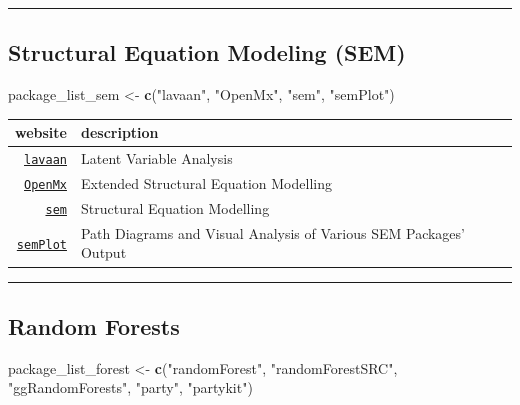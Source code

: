 \documentclass[]{book}
\newenvironment{Shaded}{\begin{snugshade}}{\end{snugshade}}
\newcommand{\KeywordTok}[1]{\textcolor[rgb]{0.13,0.29,0.53}{\textbf{#1}}}
\newcommand{\StringTok}[1]{\textcolor[rgb]{0.31,0.60,0.02}{#1}}
\newcommand{\NormalTok}[1]{#1}
\theoremstyle{definition}
\theoremstyle{definition}
\theoremstyle{definition}
\theoremstyle{remark}
\begin{document}
\begin{center}\rule{0.5\linewidth}{\linethickness}\end{center}

\subsection{Structural Equation Modeling
(SEM)}\label{structural-equation-modeling-sem}

\begin{Shaded}
\begin{Highlighting}[]
\NormalTok{package_list_sem <-}\StringTok{ }\KeywordTok{c}\NormalTok{(}\StringTok{"lavaan"}\NormalTok{,}
                      \StringTok{"OpenMx"}\NormalTok{,}
                      \StringTok{"sem"}\NormalTok{,}
                      \StringTok{"semPlot"}\NormalTok{)}
\end{Highlighting}
\end{Shaded}

\begin{longtable}[]{@{}rl@{}}
\toprule
website & description\tabularnewline
\midrule
\endhead
\href{http://lavaan.org}{\texttt{lavaan}} & Latent Variable
Analysis\tabularnewline
\href{https://openmx.ssri.psu.edu/}{\texttt{OpenMx}} & Extended
Structural Equation Modelling\tabularnewline
\href{https://www.methodsconsultants.com/tutorial/structural-equation-models-using-the-sem-package-in-r/}{\texttt{sem}}
& Structural Equation Modelling\tabularnewline
\href{http://sachaepskamp.com/semPlot/examples}{\texttt{semPlot}} & Path
Diagrams and Visual Analysis of Various SEM Packages'
Output\tabularnewline
\bottomrule
\end{longtable}

\begin{center}\rule{0.5\linewidth}{\linethickness}\end{center}

\subsection{Random Forests}\label{random-forests}

\begin{Shaded}
\begin{Highlighting}[]
\NormalTok{package_list_forest <-}\StringTok{ }\KeywordTok{c}\NormalTok{(}\StringTok{"randomForest"}\NormalTok{,}
                         \StringTok{"randomForestSRC"}\NormalTok{,}
                         \StringTok{"ggRandomForests"}\NormalTok{,}
                         \StringTok{"party"}\NormalTok{,}
                         \StringTok{"partykit"}\NormalTok{)}
\end{Highlighting}
\end{Shaded}
\end{document}

